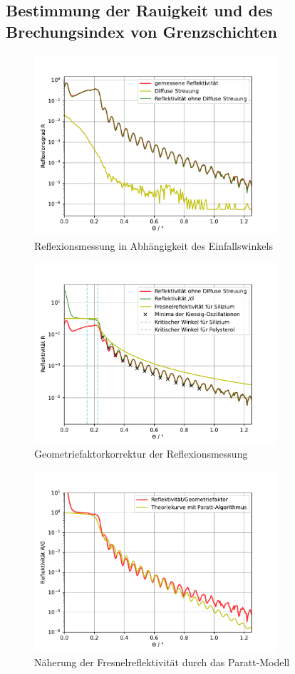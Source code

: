 \subsection{Bestimmung der Rauigkeit und des Brechungsindex von Grenzschichten}
\begin{figure}[H]
    \centering
    \includegraphics[width=0.8\textwidth]{plots/Reflektionsmessung.pdf}
    \caption{Reflexionsmessung in Abhängigkeit des Einfallswinkels}
    \label{fig:Reflektionsmessung}
\end{figure}

\begin{figure}[H]
    \centering
    \includegraphics[width=0.8\textwidth]{plots/KorrigierteReflektionsmessung.pdf}
    \caption{Geometriefaktorkorrektur der Reflexionsmessung}
    \label{fig:KorrigierteReflektionsmessung}
\end{figure}

\begin{figure}[H]
    \centering
    \includegraphics[width=0.8\textwidth]{plots/Parattplot.pdf}
    \caption{Näherung der Fresnelreflektivität durch das Paratt-Modell}
    \label{fig:Parattplot}
\end{figure}



